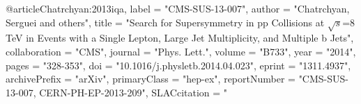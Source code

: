 @article{Chatrchyan:2013iqa,
      label          = "CMS-SUS-13-007",
      author         = "Chatrchyan, Serguei and others",
      title          = "{Search for Supersymmetry in pp Collisions at
                        $\sqrt{s}$=8 TeV in Events with a Single Lepton, Large Jet
                        Multiplicity, and Multiple b Jets}",
      collaboration  = "CMS",
      journal        = "Phys. Lett.",
      volume         = "B733",
      year           = "2014",
      pages          = "328-353",
      doi            = "10.1016/j.physletb.2014.04.023",
      eprint         = "1311.4937",
      archivePrefix  = "arXiv",
      primaryClass   = "hep-ex",
      reportNumber   = "CMS-SUS-13-007, CERN-PH-EP-2013-209",
      SLACcitation   = "%
}

